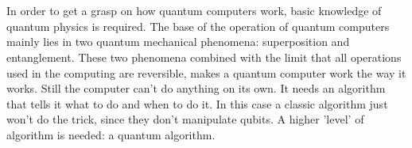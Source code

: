 \chapter{}
\label{ch:stand-van-zaken}






In order to get a grasp on how quantum computers work, basic knowledge of quantum physics is required.
The base of the operation of quantum computers mainly lies in two quantum mechanical phenomena: superposition and entanglement.
These two phenomena combined with the limit that all operations used in the computing are reversible, makes a quantum computer work the way it works.
Still the computer can't do anything on its own. It needs an algorithm that tells it what to do and when to do it.
In this case a classic algorithm just won't do the trick, since they don't manipulate qubits. A higher 'level' of algorithm is needed: a quantum algorithm.

